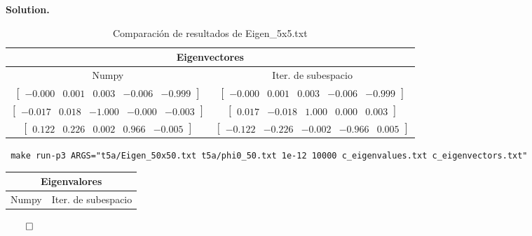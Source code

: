 \documentclass{article}
\theoremstyle{problemstyle}
\newenvironment{solution}{%
  \begin{mdframed}[linewidth=0.8pt,linecolor=Gray,backgroundcolor=Gray!5,roundcorner=5pt]%
  \noindent\textbf{Solution.}%
}{%
\hfill $ \qed $ 
  \end{mdframed}%
}
\begin{document}
\begin{solution}
	\begin{table}[H]
		\begin{center}
			\begin{tabular}{|c|c|}
				\multicolumn{2}{c}{Eigenvectores}                                  \\
				\hline
				Numpy                                      & Iter. de subespacio   \\
				\hline
				\rule{0pt}{1.5em}
				$ \begin{bmatrix}
						  -0.000 & 0.001 & 0.003 & -0.006 & -0.999
					  \end{bmatrix} $  &
				$ \begin{bmatrix}
						  -0.000 & 0.001 & 0.003 & -0.006 & -0.999
					  \end{bmatrix} $                         \\
				[0.5em]
				\hline
				\rule{0pt}{1.5em}
				$ \begin{bmatrix}
						  -0.017 & 0.018 & -1.000 & -0.000 & -0.003
					  \end{bmatrix} $ & $ \begin{bmatrix}
						                      0.017 & -0.018 & 1.000 & 0.000 & 0.003
					                      \end{bmatrix} $       \\
				[0.5em]
				\hline
				\rule{0pt}{1.5em}
				$ \begin{bmatrix}
						  0.122 & 0.226 & 0.002 & 0.966 & -0.005
					  \end{bmatrix} $    & $ \begin{bmatrix}
						                         -0.122 & -0.226 & -0.002 & -0.966 & 0.005
					                         \end{bmatrix} $ \\
				[0.5em]
				\hline
			\end{tabular}

		\end{center}
		\caption{Comparaci\'on de resultados de Eigen\_5x5.txt}\label{tab:evecs5x5_new}
	\end{table}
	\begin{center}
		\texttt{
			make run-p3 ARGS="t5a/Eigen\_50x50.txt t5a/phi0\_50.txt 1e-12
			10000 c\_eigenvalues.txt c\_eigenvectors.txt"
		}

	\end{center}
	\begin{table}[H]
		\begin{center}
			\begin{tabular}{|c|c|}
				\multicolumn{2}{c}{Eigenvalores}          \\
				\hline
				Numpy               & Iter. de subespacio \\
				\hline


\end{tabular}
\end{center}
\end{table}
\end{solution}
\end{document}
